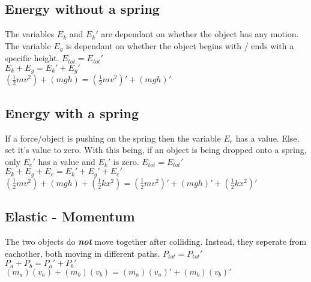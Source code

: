 \begin{adjustwidth}{1cm}{0pt}
    \subsection{Energy without a spring}
    \begin{flushleft}
        The variables $E_{k}$ and $E_{k}\prime$ are dependant on whether the object has any motion. The variable $E_{g}$ is dependant on whether the object begins with / ends with a specific height.\newline\newline
        $E_{tot} = E_{tot}\prime$ \\
        \vspace*{10pt}
        $E_{k} + E_{g} = E_{k}\prime + E_{g}\prime$ \\
        \vspace*{10pt}
        $(\frac{1}{2}mv^2) + (mgh) = (\frac{1}{2}mv^2)\prime + (mgh)\prime$
    \end{flushleft}
    \subsection{Energy with a spring}
    \begin{flushleft}
        If a force/object is pushing on the spring then the variable $E_{e}$ has a value. Else, set it's value to zero. With this being, if an object is being dropped onto a spring, only $E_{e}\prime$ has a value and $E_{k}\prime$ is zero.\newline\newline
        $E_{tot} = E_{tot}\prime$ \\
        \vspace*{10pt}
        $E_{k} + E_{g} + E_{e} = E_{k}\prime + E_{g}\prime + E_{e}\prime$ \\
        \vspace*{10pt}
        $(\frac{1}{2}mv^2) + (mgh) + (\frac{1}{2}kx^2) = (\frac{1}{2}mv^2)\prime + (mgh)\prime + (\frac{1}{2}kx^2)\prime$
    \end{flushleft}
    \subsection{Elastic - Momentum}
    \begin{flushleft}
        The two objects do \textbf{\textit{not}} move together after colliding. Instead, they seperate from eachother, both moving in different paths.\newline\newline
        $P_{tot} = P_{tot}\prime$ \\
        \vspace*{10pt}
        $P_{a} + P_{b} = P_{a}\prime + P_{b}\prime$ \\
        \vspace*{10pt}
        $(m_{a})(v_{a}) + (m_{b})(v_{b}) = (m_{a})(v_{a})\prime + (m_{b})(v_{b})\prime$
    \end{flushleft}
    \vspace*{0.03cm}

\end{adjustwidth}
